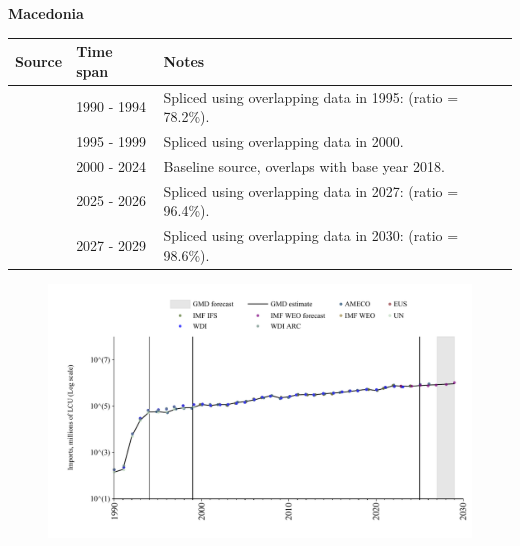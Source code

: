 \documentclass[12pt,a4paper,landscape]{article}
\begin{document}
\begin{adjustbox}{max totalsize={\paperwidth}{\paperheight},center}
\begin{minipage}[t][\textheight][t]{\textwidth}
\vspace*{0.5cm}
{}
\begin{center}
{\Large\bfseries Macedonia}
\end{center}
\vspace{0.5cm}
\begin{table}[H]
\centering
\small
\begin{tabular}{|l|l|l|}
\hline
\textbf{Source} & \textbf{Time span} & \textbf{Notes} \\
\hline
\rowcolor{white}\cite{WDI}& 1990 - 1994 &Spliced using overlapping data in 1995: (ratio = 78.2\%).\\
\rowcolor{lightgray}\cite{AMECO}& 1995 - 1999 &Spliced using overlapping data in 2000.\\
\rowcolor{white}\cite{EUS}& 2000 - 2024 &Baseline source, overlaps with base year 2018.\\
\rowcolor{lightgray}\cite{AMECO}& 2025 - 2026 &Spliced using overlapping data in 2027: (ratio = 96.4\%).\\
\rowcolor{white}\cite{IMF_WEO_forecast}& 2027 - 2029 &Spliced using overlapping data in 2030: (ratio = 98.6\%).\\
\hline
\end{tabular}
\end{table}
\begin{figure}[H]
\centering
\includegraphics[width=\textwidth,height=0.6\textheight,keepaspectratio]{graphs/MKD_imports.pdf}
\end{figure}
\end{minipage}
\end{adjustbox}
\end{document}
